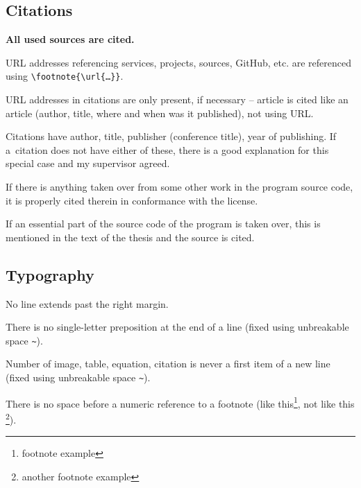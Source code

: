 \subsection*{Citations}
\begin{checklist}
	\item \bf All used sources are cited. \rm
	\item URL addresses referencing services, projects, sources, GitHub, etc. are referenced using \verb|\footnote{\url{…}}|.
    \item URL addresses in citations are only present, if necessary – article is cited like an article (author, title, where and when was it published), not using URL.
    \item Citations have author, title, publisher (conference title), year of publishing. If a~citation does not have either of these, there is a good explanation for this special case and my supervisor agreed.
    \item If there is anything taken over from some other work in the program source code, it is properly cited therein in conformance with the license.
	\item If an essential part of the source code of the program is taken over, this is mentioned in the text of the thesis and the source is cited.
\end{checklist}

\subsection*{Typography}
\begin{checklist}
	\item No line extends past the right margin.
    \item There is no single-letter preposition at the end of a line (fixed using unbreakable space \verb|~|).
    \item Number of image, table, equation, citation is never a first item of a new line (fixed using unbreakable space \verb|~|).
    \item There is no space before a numeric reference to a footnote (like this\footnote{footnote example}, not like this \footnote{another footnote example}).
\end{checklist}

